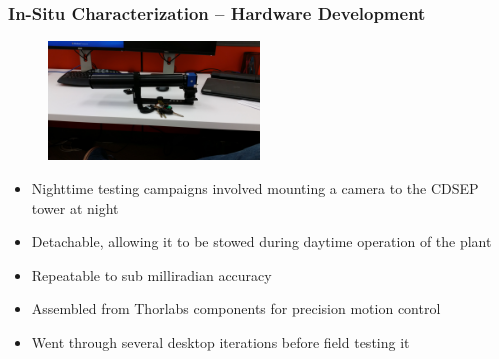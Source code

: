 \documentclass[aspectratio=169]{beamer}
\begin{document}
\begin{frame}
  \frametitle{In-Situ Characterization -- Hardware Development}
  \begin{figure}
    \includegraphics[width=0.5\textwidth]{CameraMount.jpg}
  \end{figure}
  \begin{itemize}
  \item Nighttime testing campaigns involved mounting a camera to the
    CDSEP tower at night
  \item Detachable, allowing it to be stowed during daytime operation of the plant
  \item Repeatable to sub milliradian accuracy
  \item Assembled from Thorlabs components for precision motion control
  \item Went through several desktop iterations before field testing it
  \end{itemize}
\end{frame}
\end{document}

